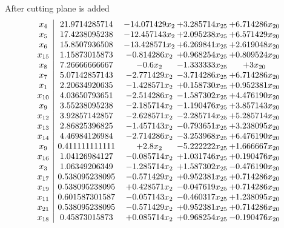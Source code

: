 \documentclass[11pt]{article}
\begin{document}
 After cutting plane is added 
\[\begin{array}{c| c c@{\hskip 2pt} c@{\hskip 2pt} c@{\hskip 2pt} }
 x_{4}   &  21.9714285714 & -14.071429 x_{2} & + 3.285714 x_{25} & + 6.714286 x_{20}\\
 x_{5}   &  17.4238095238 & -12.457143 x_{2} & + 2.095238 x_{25} & + 6.571429 x_{20}\\
 x_{6}   &  15.8507936508 & -13.428571 x_{2} & + 6.269841 x_{25} & + 2.619048 x_{20}\\
 x_{15}   &  1.15873015873 & -0.814286 x_{2} & + 0.968254 x_{25} & + 0.809524 x_{20}\\
 x_{8}   &  7.26666666667 & -0.6 x_{2} & -1.333333 x_{25} & + 3 x_{20}\\
 x_{7}   &  5.07142857143 & -2.771429 x_{2} & -3.714286 x_{25} & + 6.714286 x_{20}\\
 x_{1}   &  2.20634920635 & -1.428571 x_{2} & + 0.158730 x_{25} & + 0.952381 x_{20}\\
 x_{10}   &  4.03650793651 & -2.514286 x_{2} & -1.587302 x_{25} & + 4.476190 x_{20}\\
 x_{9}   &  3.55238095238 & -2.185714 x_{2} & -1.190476 x_{25} & + 3.857143 x_{20}\\
 x_{12}   &  3.92857142857 & -2.628571 x_{2} & -2.285714 x_{25} & + 5.285714 x_{20}\\
 x_{13}   &  2.86825396825 & -1.457143 x_{2} & -0.793651 x_{25} & + 3.238095 x_{20}\\
 x_{14}   &  4.46984126984 & -2.714286 x_{2} & -3.253968 x_{25} & + 6.476190 x_{20}\\
 x_{9}   &  0.411111111111 & + 2.8 x_{2} & -5.222222 x_{25} & + 1.666667 x_{20}\\
 x_{16}   &  1.04126984127 & -0.085714 x_{2} & + 1.031746 x_{25} & + 0.190476 x_{20}\\
 x_{3}   &  1.06349206349 & -1.285714 x_{2} & + 1.587302 x_{25} & -0.476190 x_{20}\\
 x_{17}   &  0.538095238095 & -0.571429 x_{2} & + 0.952381 x_{25} & + 0.714286 x_{20}\\
 x_{19}   &  0.538095238095 & + 0.428571 x_{2} & -0.047619 x_{25} & + 0.714286 x_{20}\\
 x_{11}   &  0.601587301587 & -0.057143 x_{2} & -0.460317 x_{25} & + 1.238095 x_{20}\\
 x_{21}   &  0.538095238095 & -0.571429 x_{2} & + 0.952381 x_{25} & + 0.714286 x_{20}\\
 x_{18}   &  0.45873015873 & + 0.085714 x_{2} & + 0.968254 x_{25} & -0.190476 x_{20}\\

\end{array}\]
\end{document}
